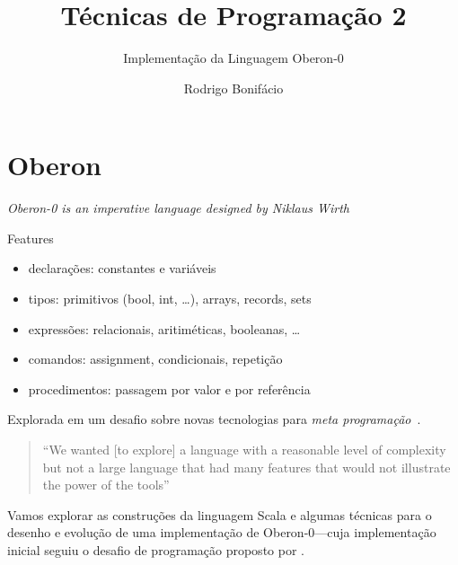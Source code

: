\documentclass{beamer}
\title{T\'{e}cnicas de Programa\c c\~{a}o 2}
\subtitle{Implementa\c c\~{a}o da Linguagem Oberon-0}
\author{Rodrigo Bonif\'{a}cio}
\begin{document}
\begin{frame}
 \titlepage
\end{frame}

\section{Oberon}

\begin{frame}

  \emph{Oberon-0 is an imperative language designed by Niklaus Wirth}~\citep{wirth1996compiler,ldta-scp} \pause

  \begin{block}{Features}
     \begin{itemize}
      \item declara\c c\~{o}es: constantes e vari\'{a}veis
      \item tipos: primitivos (bool, int, \ldots), arrays, records, sets
      \item express\~{o}es: relacionais, aritim\'{e}ticas, booleanas, \ldots
      \item comandos: assignment, condicionais, repeti\c c\~{a}o
      \item procedimentos: passagem por valor e por refer\^{e}ncia  
     \end{itemize}
  \end{block}
  \pause
  

  \begin{center}
  Explorada em um desafio sobre novas tecnologias para
     \emph{meta programa\c c\~{a}o}~\citep{ldta-scp}. 
  \end{center}
  
\end{frame}

\begin{frame}
  \begin{quotation}
    ``We wanted [to explore] a language with a
    reasonable level of complexity but not a large language that
    had many features that would not illustrate the power of the tools''
  \end{quotation}
  \begin{flushright}
    \citep{ldta-scp}
  \end{flushright} \pause

  Vamos explorar as constru\c c\~{o}es da linguagem Scala e
  algumas t\'{e}cnicas para o
  {\color{blue}desenho} e {\color{blue}evolu\c c\~{a}o}
  de uma implementa\c c\~{a}o de Oberon-0\pause---cuja implementa\c c\~{a}o inicial seguiu o desafio de programa\c c\~{a}o proposto por  \citet{ldta-scp}.
\end{frame}
\end{document}
